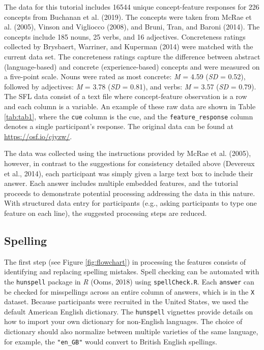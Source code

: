 \documentclass[man]{apa6}
\begin{document}
The data for this tutorial includes 16544 unique concept-feature responses for 226 concepts from Buchanan et al. (2019). The concepts were taken from McRae et al. (2005), Vinson and Vigliocco (2008), and Bruni, Tran, and Baroni (2014). The concepts include 185 nouns, 25 verbs, and 16 adjectives. Concreteness ratings collected by Brysbaert, Warriner, and Kuperman (2014) were matched with the current data set. The concreteness ratings capture the difference between abstract (language-based) and concrete (experience-based) concepts and were measured on a five-point scale. Nouns were rated as most concrete: \emph{M} = 4.59 (\emph{SD} = 0.52), followed by adjectives: \emph{M} = 3.78 (\emph{SD} = 0.81), and verbs: \emph{M} = 3.57 (\emph{SD} = 0.79). The SFL data consist of a text file where concept-feature observation is a row and each column is a variable. An example of these raw data are shown in Table \ref{tab:tab1}, where the \texttt{cue} column is the cue, and the \texttt{feature\_response} column denotes a single participant's response. The original data can be found at \url{https://osf.io/cjyzw/}.

The data was collected using the instructions provided by McRae et al. (2005), however, in contrast to the suggestions for consistency detailed above (Devereux et al., 2014), each participant was simply given a large text box to include their answer. Each answer includes multiple embedded features, and the tutorial proceeds to demonstrate potential processing addressing the data in this nature. With structured data entry for participants (e.g., asking participants to type one feature on each line), the suggested processing steps are reduced.

\hypertarget{spelling}{%
\subsection{Spelling}\label{spelling}}

The first step (see Figure \ref{fig:flowchart}) in processing the features consists of identifying and replacing spelling mistakes. Spell checking can be automated with the \texttt{hunspell} package in \emph{R} (Ooms, 2018) using \texttt{spellCheck.R}. Each \texttt{answer} can be checked for misspellings across an entire column of answers, which is in the \texttt{X} dataset. Because participants were recruited in the United States, we used the default American English dictionary. The \texttt{hunspell} vignettes provide details on how to import your own dictionary for non-English languages. The choice of dictionary should also normalize between multiple varieties of the same language, for example, the \texttt{"en\_GB"} would convert to British English spellings.
\end{document}
